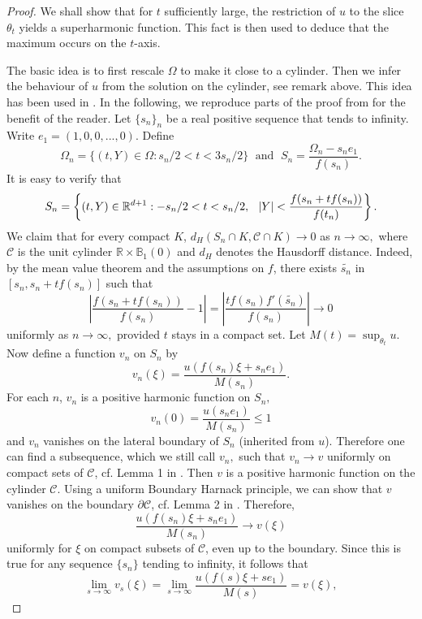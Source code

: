 \documentclass[11pt]{amsart}
\theoremstyle{definition}
\theoremstyle{remark}
\begin{document}
\begin{proof}
We shall show that for $t$ sufficiently large, the restriction of $u$ to the slice $\theta_t$ yields a superharmonic function. This fact is then used to deduce that the maximum occurs on the $t$-axis. 

\vspace{0.1in}

The basic idea  is to first rescale $\Omega$ to make it close to a cylinder. Then we infer the behaviour of $u$ from the solution on the cylinder, see remark above. This idea has been used in \cite{KR}. In the following, we reproduce parts of the proof from \cite{KR} for the benefit of the reader.  Let $\{s_n\}_n$ be a real positive sequence  that tends to infinity. Write $e_1 = (1, 0, 0,...,0)$. Define $$\Omega_n = \{(t, Y)\in\Omega: s_n/2 < t < 3s_n/2\}\;\text{ and }\; S_n = \dfrac{\Omega_n - s_ne_1}{f(s_n)}.$$ It is easy to verify that 
$$S_n = \left\{(t,Y)\in\mathbb{R}^{d+1}: -s_n/2 < t < s_n/2, \hspace{0.1in} |Y| < \dfrac{f(s_n + tf(s_n))}{f(t_n)}\right\}.$$  
We claim that for every compact $K$, $d_H(S_n\cap K, \mathcal{C}\cap K)\to 0$ as $n\to\infty,$ where $\mathcal{C}$ is the unit cylinder $\mathbb{R}\times \mathbb{B}_1(0)$ and $d_H$ denotes the Hausdorff distance. Indeed, by the mean value theorem and the assumptions on $f$, there exists $\widetilde{s_n}$ in $[s_n, s_n + tf(s_n)]$ such that
$$\left|\dfrac{f(s_n + tf(s_n))}{f(s_n)} - 1\right| = \left|\dfrac{tf(s_n)f'(\widetilde {s_n})}{f(s_n)}\right|\to 0$$ 
\noindent  uniformly as $n\to\infty,$ provided $t$ stays in a compact set. Let $M(t) = \sup_{\theta_t}u.$ Now define a function $v_n$ on $S_n$ by 
%
$$v_n(\xi) = \dfrac{u(f(s_n)\xi + s_ne_1)}{M(s_n)}.$$
\noindent For each $n$, $v_n$ is a positive harmonic function on $S_n,$ $$v_n(0) = \dfrac{u(s_ne_1)}{M(s_n)}\leq 1$$ and $v_n$ vanishes on the lateral boundary of $S_n$ (inherited from $u$). Therefore one can find a subsequence, which we still call $ v_n,$ such that $v_{n}\to v$ uniformly on compact sets of $\mathcal{C}$, cf. Lemma 1 in \cite{KR}. Then $v$ is a positive harmonic function on the cylinder $\mathcal{C}$. Using a uniform Boundary Harnack principle, we can show that $v$ vanishes on the boundary $\partial\mathcal{C}$, cf. Lemma 2 in \cite{KR}. Therefore,
$$ \dfrac{u(f(s_n)\xi + s_ne_1)}{M(s_n)}\to v(\xi)$$ 
uniformly for $\xi$ on compact subsets of $\mathcal{C}$, even up to the boundary. Since this is true for any sequence $\{s_n\}$ tending to infinity, it follows that
$$\lim_{s\to\infty} v_s(\xi)=\lim_{s\to\infty}\dfrac{u(f(s)\xi + se_1)}{M(s)}= v(\xi),$$

\end{proof}
\end{document}
